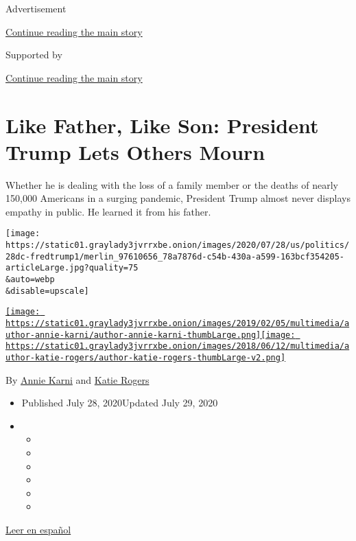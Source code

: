 Advertisement

\protect\hyperlink{after-top}{Continue reading the main story}

Supported by

\protect\hyperlink{after-sponsor}{Continue reading the main story}

\hypertarget{like-father-like-son-president-trump-lets-others-mourn}{%
\section{Like Father, Like Son: President Trump Lets Others
Mourn}\label{like-father-like-son-president-trump-lets-others-mourn}}

Whether he is dealing with the loss of a family member or the deaths of
nearly 150,000 Americans in a surging pandemic, President Trump almost
never displays empathy in public. He learned it from his father.

\texttt{[image: https://static01.graylady3jvrrxbe.onion/images/2020/07/28/us/politics/28dc-fredtrump1/merlin\_97610656\_78a7876d-c54b-430a-a599-163bcf354205-articleLarge.jpg?quality=75\\\&auto=webp\\\&disable=upscale]}

\href{https://www.nytimes3xbfgragh.onion/by/annie-karni}{\texttt{[image: https://static01.graylady3jvrrxbe.onion/images/2019/02/05/multimedia/author-annie-karni/author-annie-karni-thumbLarge.png]}}\href{https://www.nytimes3xbfgragh.onion/by/katie-rogers}{\texttt{[image: https://static01.graylady3jvrrxbe.onion/images/2018/06/12/multimedia/author-katie-rogers/author-katie-rogers-thumbLarge-v2.png]}}

By \href{https://www.nytimes3xbfgragh.onion/by/annie-karni}{Annie Karni}
and \href{https://www.nytimes3xbfgragh.onion/by/katie-rogers}{Katie
Rogers}

\begin{itemize}
\item
  Published July 28, 2020Updated July 29, 2020
\item
  \begin{itemize}
  \item
  \item
  \item
  \item
  \item
  \item
  \end{itemize}
\end{itemize}

\href{https://www.nytimes3xbfgragh.onion/es/2020/07/31/espanol/estados-unidos/fred-trump-donald-trump.html}{Leer
en español}

